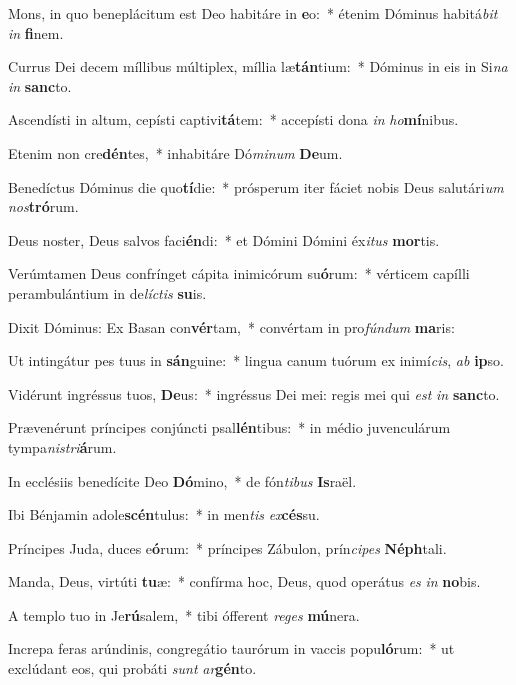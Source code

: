 \item Mons, in quo beneplácitum est Deo habitáre in \textbf{e}o:~* étenim Dóminus habitá\textit{bit} \textit{in} \textbf{fi}nem.
\item Currus Dei decem míllibus múltiplex, míllia læ\textbf{tán}tium:~* Dóminus in eis in Si\textit{na} \textit{in} \textbf{sanc}to.
\item Ascendísti in altum, cepísti captivi\textbf{tá}tem:~* accepísti dona \textit{in} \textit{ho}\textbf{mí}nibus.
\item Etenim non cre\textbf{dén}tes,~* inhabitáre Dó\textit{mi}\textit{num} \textbf{De}um.
\item Benedíctus Dóminus die quo\textbf{tí}die:~* prósperum iter fáciet nobis Deus salutári\textit{um} \textit{nos}\textbf{tró}rum.
\item Deus noster, Deus salvos faci\textbf{én}di:~* et Dómini Dómini éx\textit{i}\textit{tus} \textbf{mor}tis.
\item Verúmtamen Deus confrínget cápita inimicórum su\textbf{ó}rum:~* vérticem capílli perambulántium in de\textit{líc}\textit{tis} \textbf{su}is.
\item Dixit Dóminus: Ex Basan con\textbf{vér}tam,~* convértam in pro\textit{fún}\textit{dum} \textbf{ma}ris:
\item Ut intingátur pes tuus in \textbf{sán}guine:~* lingua canum tuórum ex inimí\textit{cis}, \textit{ab} \textbf{ip}so.
\item Vidérunt ingréssus tuos, \textbf{De}us:~* ingréssus Dei mei: regis mei qui \textit{est} \textit{in} \textbf{sanc}to.
\item Prævenérunt príncipes conjúncti psal\textbf{lén}tibus:~* in médio juvenculárum tympa\textit{nis}\textit{tri}\textbf{á}rum.
\item In ecclésiis benedícite Deo \textbf{Dó}mino,~* de fón\textit{ti}\textit{bus} \textbf{Is}raël.
\item Ibi Bénjamin adole\textbf{scén}tu\-lus:~* in men\textit{tis} \textit{ex}\textbf{cés}su.
\item Príncipes Juda, duces e\textbf{ó}rum:~* príncipes Zábulon, prín\textit{ci}\textit{pes} \textbf{Néph}tali.
\item Manda, Deus, virtúti \textbf{tu}æ:~* confírma hoc, Deus, quod operátus \textit{es} \textit{in} \textbf{no}bis.
\item A templo tuo in Je\textbf{rú}salem,~* tibi ófferent \textit{re}\textit{ges} \textbf{mú}nera.
\item Increpa feras arúndinis, congregátio taurórum in vaccis popu\textbf{ló}rum:~* ut exclúdant eos, qui probáti \textit{sunt} \textit{ar}\textbf{gén}to.
